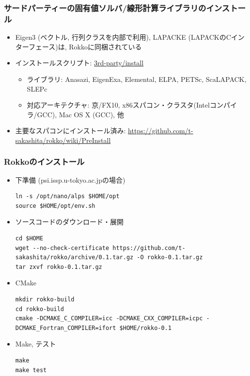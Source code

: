 \begin{frame}
  \frametitle{サードパーティーの固有値ソルバ/線形計算ライブラリのインストール}
  \begin{itemize}
    \setlength{\itemsep}{1em}
  \item Eigen3 (ベクトル, 行列クラスを内部で利用), LAPACKE (LAPACKのCインターフェース)は, Rokkoに同梱されている
  \item インストールスクリプト: \href{https://github.com/t-sakashita/rokko/tree/master/3rd-party/install}{3rd-party/install}
    \begin{itemize}
      \item ライブラリ: Anasazi, EigenExa, Elemental, ELPA, PETSc, ScaLAPACK, SLEPc
      \item 対応アーキテクチャ: 京/FX10, x86スパコン・クラスタ(Intelコンパイラ/GCC), Mac OS X (GCC), 他
    \end{itemize}
  \item 主要なスパコンにインストール済み: \url{https://github.com/t-sakashita/rokko/wiki/PreInstall}
  \end{itemize}
\end{frame}

\begin{frame}[c,fragile]
  \frametitle{Rokkoのインストール}
  \begin{itemize}
  \item 下準備 (psi.issp.u-tokyo.ac.jpの場合)
\begin{lstlisting}[style=shstyle]
ln -s /opt/nano/alps $HOME/opt
source $HOME/opt/env.sh
\end{lstlisting}
  \item ソースコードのダウンロード・展開
\begin{lstlisting}[style=shstyle]
cd $HOME
wget --no-check-certificate https://github.com/t-sakashita/rokko/archive/0.1.tar.gz -O rokko-0.1.tar.gz
tar zxvf rokko-0.1.tar.gz
\end{lstlisting}
  \item CMake
\begin{lstlisting}[style=shstyle]
mkdir rokko-build
cd rokko-build
cmake -DCMAKE_C_COMPILER=icc -DCMAKE_CXX_COMPILER=icpc -DCMAKE_Fortran_COMPILER=ifort $HOME/rokko-0.1
\end{lstlisting}
  \item Make, テスト
\begin{lstlisting}
make
make test
\end{lstlisting}
  \end{itemize}
\end{frame}

